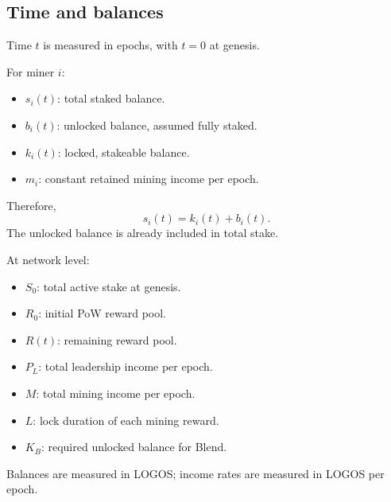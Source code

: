 \documentclass[11pt,a4paper]{article}
\begin{document}
\subsection{Time and balances}
Time $t$ is measured in epochs, with $t=0$ at genesis.

For miner $i$:
\begin{itemize}
\item $s_i(t)$: total staked balance.
\item $b_i(t)$: unlocked balance, assumed fully staked.
\item $k_i(t)$: locked, stakeable balance.
\item $m_i$: constant retained mining income per epoch.
\end{itemize}
Therefore,
\begin{equation}
\boxed{s_i(t)=k_i(t)+b_i(t).}
\end{equation}
The unlocked balance is already included in total stake.

At network level:
\begin{itemize}
\item $S_0$: total active stake at genesis.
\item $R_0$: initial PoW reward pool.
\item $R(t)$: remaining reward pool.
\item $P_L$: total leadership income per epoch.
\item $M$: total mining income per epoch.
\item $L$: lock duration of each mining reward.
\item $K_B$: required unlocked balance for Blend.
\end{itemize}
Balances are measured in LOGOS; income rates are measured in LOGOS per epoch.
\end{document}
